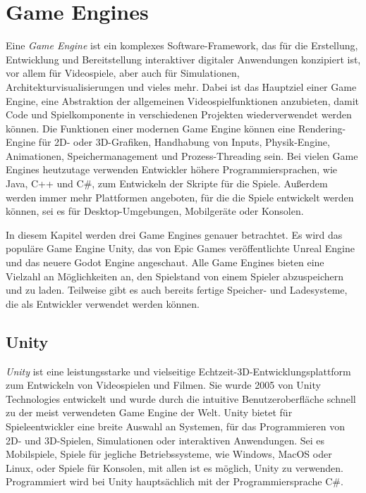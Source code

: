 \chapter{Game Engines}\label{ch:gameengines}
Eine \textit{Game Engine} ist ein komplexes Software-Framework, das für die Erstellung, Entwicklung und Bereitstellung interaktiver digitaler Anwendungen konzipiert ist, vor allem für Videospiele, aber auch für Simulationen, Architekturvisualisierungen und vieles mehr. Dabei ist das Hauptziel einer Game Engine, eine Abstraktion der allgemeinen Videospielfunktionen anzubieten, damit Code und Spielkomponente in verschiedenen Projekten wiederverwendet werden können. Die Funktionen einer modernen Game Engine können eine Rendering-Engine für 2D- oder 3D-Grafiken, Handhabung von Inputs, Physik-Engine, Animationen, Speichermanagement und Prozess-Threading sein. Bei vielen Game Engines heutzutage verwenden Entwickler höhere Programmiersprachen, wie Java, C++ und C\#, zum Entwickeln der Skripte für die Spiele. Außerdem werden immer mehr Plattformen angeboten, für die die Spiele entwickelt werden können, sei es für Desktop-Umgebungen, Mobilgeräte oder Konsolen.\cite{andrade2015game}

In diesem Kapitel werden drei Game Engines genauer betrachtet. Es wird das populäre Game Engine Unity, das von Epic Games veröffentlichte Unreal Engine und das neuere Godot Engine angeschaut. Alle Game Engines bieten eine Vielzahl an Möglichkeiten an, den Spielstand von einem Spieler abzuspeichern und zu laden. Teilweise gibt es auch bereits fertige Speicher- und Ladesysteme, die als Entwickler verwendet werden können.




\section{Unity}
\textit{Unity} ist eine leistungsstarke und vielseitige Echtzeit-3D-Entwicklungsplattform zum Entwickeln von Videospielen und Filmen. Sie wurde 2005 von Unity Technologies entwickelt und wurde durch die intuitive Benutzeroberfläche schnell zu der meist verwendeten Game Engine der Welt. Unity bietet für Spieleentwickler eine breite Auswahl an Systemen, für das Programmieren von 2D- und 3D-Spielen, Simulationen oder interaktiven Anwendungen. Sei es Mobilspiele, Spiele für jegliche Betriebssysteme, wie Windows, MacOS oder Linux, oder Spiele für Konsolen, mit allen ist es möglich, Unity zu verwenden. Programmiert wird bei Unity hauptsächlich mit der Programmiersprache C\#.\cite{unityUnityEngine}\cite{vsmid2017comparison}

